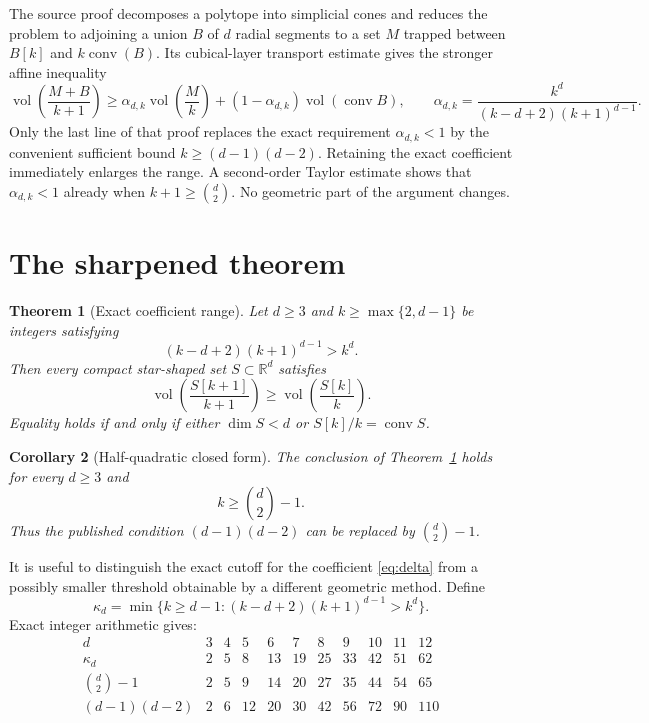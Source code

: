 \documentclass[11pt]{article}
\newtheorem{theorem}{Theorem}
\newtheorem{corollary}[theorem]{Corollary}
\newcommand{\R}{\mathbb R}
\newcommand{\vol}{\operatorname{vol}}
\newcommand{\conv}{\operatorname{conv}}
\begin{document}
The source proof decomposes a polytope into simplicial cones and reduces the
problem to adjoining a union $B$ of $d$ radial segments to a set $M$ trapped
between $B[k]$ and $k\conv(B)$.  Its cubical-layer transport estimate gives
the stronger affine inequality
\[
 \vol\!\left(\frac{M+B}{k+1}\right)
 \ge \alpha_{d,k}\vol\!\left(\frac{M}{k}\right)
 +(1-\alpha_{d,k})\vol(\conv B),
 \qquad
 \alpha_{d,k}=\frac{k^d}{(k-d+2)(k+1)^{d-1}}.
\]
Only the last line of that proof replaces the exact requirement
$\alpha_{d,k}<1$ by the convenient sufficient bound
$k\ge(d-1)(d-2)$.  Retaining the exact coefficient immediately enlarges the
range.  A second-order Taylor estimate shows that $\alpha_{d,k}<1$ already
when $k+1\ge\binom d2$.  No geometric part of the argument changes.

\section{The sharpened theorem}

\begin{theorem}[Exact coefficient range]\label{thm:main}
Let $d\ge3$ and $k\ge\max\{2,d-1\}$ be integers satisfying
\begin{equation}\label{eq:delta}
                 (k-d+2)(k+1)^{d-1}>k^d.
\end{equation}
Then every compact star-shaped set $S\subset\R^d$ satisfies
\begin{equation}\label{eq:mono}
 \vol\!\left(\frac{S[k+1]}{k+1}\right)
 \ge \vol\!\left(\frac{S[k]}{k}\right).
\end{equation}
Equality holds if and only if either $\dim S<d$ or
$S[k]/k=\conv S$.
\end{theorem}

\begin{corollary}[Half-quadratic closed form]\label{cor:clean}
The conclusion of Theorem~\ref{thm:main} holds for every $d\ge3$ and
\[
                              k\ge\binom d2-1.
\]
Thus the published condition $(d-1)(d-2)$ can be replaced by
$\binom d2-1$.
\end{corollary}

It is useful to distinguish the exact cutoff for the coefficient
\eqref{eq:delta} from a possibly smaller threshold obtainable by a different
geometric method.  Define
\[
 \kappa_d=\min\{k\ge d-1:(k-d+2)(k+1)^{d-1}>k^d\}.
\]
Exact integer arithmetic gives:
\[
\begin{array}{c|rrrrrrrrrr}
d&3&4&5&6&7&8&9&10&11&12\\ \hline
\kappa_d&2&5&8&13&19&25&33&42&51&62\\
\binom d2-1&2&5&9&14&20&27&35&44&54&65\\
(d-1)(d-2)&2&6&12&20&30&42&56&72&90&110
\end{array}
\]
\end{document}
